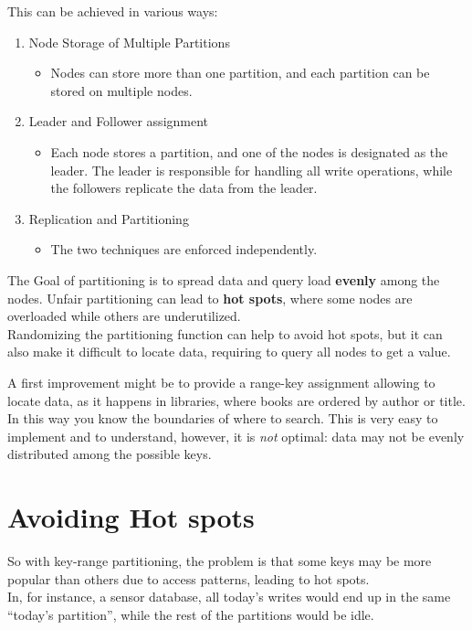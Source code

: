 This can be achieved in various ways:
\begin{enumerate}
   \item Node Storage of Multiple Partitions
   \begin{itemize}
      \item Nodes can store more than one partition, and each partition can be stored on multiple nodes.
   \end{itemize}
   \item Leader and Follower assignment
   \begin{itemize}
      \item Each node stores a partition, and one of the nodes is designated as the leader. The leader is responsible for handling all write operations, while the followers replicate the data from the leader.
   \end{itemize}
   \item Replication and Partitioning
   \begin{itemize}
      \item The two techniques are enforced independently.
   \end{itemize}
\end{enumerate}

The Goal of partitioning is to spread data and query load \textbf{evenly} among the nodes.
Unfair partitioning can lead to \textbf{hot spots}, where some nodes are overloaded while others are underutilized.\\
Randomizing the partitioning function can help to avoid hot spots, but it can also make it difficult to locate data, requiring to query all nodes to get a value.

A first improvement might be to provide a range-key assignment allowing to locate data, as it happens in libraries, where books are ordered by author or title.\\
In this way you know the boundaries of where to search. This is very easy to implement and to understand,
however, it is \textit{not} optimal:
data may not be evenly distributed among the possible keys.

\section{Avoiding Hot spots}
So with key-range partitioning, the problem is that some keys may be more popular than others due to access patterns, leading to hot spots.\\
In, for instance, a sensor database, all today's writes would end up in the same ``today's partition'', while the rest of the partitions would be idle.
\nl

